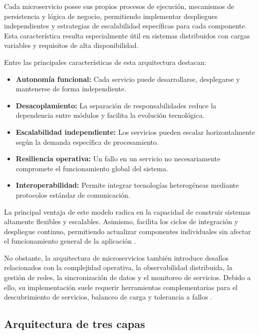 \documentclass[12pt, oneside, letterpaper]{book}
\begin{document}
Cada microservicio posee sus propios procesos de ejecución, mecanismos de persistencia y lógica de negocio, permitiendo implementar despliegues independientes y estrategias de escalabilidad específicas para cada componente. Esta característica resulta especialmente útil en sistemas distribuidos con cargas variables y requisitos de alta disponibilidad.

Entre las principales características de esta arquitectura destacan:

\begin{itemize}
\item \textbf{Autonomía funcional:} Cada servicio puede desarrollarse, desplegarse y mantenerse de forma independiente.

\item \textbf{Desacoplamiento:} La separación de responsabilidades reduce la dependencia entre módulos y facilita la evolución tecnológica.

\item \textbf{Escalabilidad independiente:} Los servicios pueden escalar horizontalmente según la demanda específica de procesamiento.

\item \textbf{Resiliencia operativa:} Un fallo en un servicio no necesariamente compromete el funcionamiento global del sistema.

\item \textbf{Interoperabilidad:} Permite integrar tecnologías heterogéneas mediante protocolos estándar de comunicación.
\end{itemize}

La principal ventaja de este modelo radica en la capacidad de construir sistemas altamente flexibles y escalables. Asimismo, facilita los ciclos de integración y despliegue continuo, permitiendo actualizar componentes individuales sin afectar el funcionamiento general de la aplicación \cite{32}.

No obstante, la arquitectura de microservicios también introduce desafíos relacionados con la complejidad operativa, la observabilidad distribuida, la gestión de redes, la sincronización de datos y el monitoreo de servicios. Debido a ello, su implementación suele requerir herramientas complementarias para el descubrimiento de servicios, balanceo de carga y tolerancia a fallos \cite{32}.

\subsection{Arquitectura de tres capas}
\end{document}
